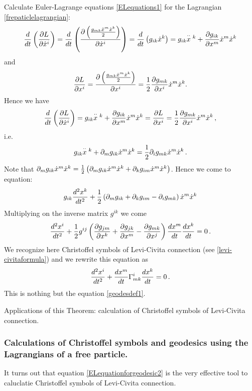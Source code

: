 \documentclass[12pt]{article}
\theoremstyle{theorem}
\numberwithin{equation}{section}
\begin{document}
{Calculate Euler-Lagrange equations \eqref{ELequations1} for the Lagrangian \eqref{frepaticlelagrangian}:
               $$
    {d\over dt}\left({\p L\over \p \dot x^i}\right)=
    {d\over dt}\left({\p \left({g_{mk}\dot x^m\dot x^k\over 2}\right)\over \p \dot x^i}\right)=
     {d\over dt}\left(g_{ik}\dot x^k\right)=
    g_{ik}{\buildrel \cdot\cdot\over x{^k}}+{\p g_{ik}\over \p x^m}\dot x^m\dot x^k
               $$
and
            $$
            {\partial L\over \partial  x^i}={\partial \left({g_{mk}\dot x^m\dot x^k\over 2}\right)\over \partial  x^i}=
            {1\over 2}{\partial g_{mk}\over \partial x^i}\dot x^m\dot x^k.
            $$
Hence we have
           $$
 {d\over dt}\left({\p L\over \p \dot x^i}\right)=
 g_{ik}{\buildrel \cdot\cdot\over x{^k}}+{\p g_{ik}\over \p x^m}\dot x^m\dot x^k=
    {\p L\over \p  x^i}={1\over 2}{\p g_{mk}\over \p x^i}\dot x^m\dot x^k\,,
           $$
  i.e.
       $$
 g_{ik}{\buildrel \cdot\cdot\over x{^k}}+\p_mg_{ik}\dot x^m\dot x^k=
 {1\over 2}\p_i g_{mk}\dot x^m\dot x^k\,.
       $$
 Note that    $\partial_mg_{ik}\dot x^m\dot x^k={1\over 2}\left(\partial_mg_{ik}\dot x^m\dot x^k+\partial_kg_{im}\dot x^m\dot x^k\right)$.
Hence we come to equation:
               $$
               g_{ik}{d^2 x^k\over dt^2}+
               {1\over 2}\left(
 \partial_mg_{ik}+\partial_kg_{im}-\partial_ig_{mk}
                  \right)\dot x^m\dot x^k
               $$
 Multiplying on the inverse matrix $g^{ik}$ we come
\begin{equation}\label{ELequationforgeodesic1}
    {d^2 x^i\over dt^2}+{1\over 2}g^{ij}\left({\partial g_{jm}\over\partial x^k}+
    {\partial g_{jk}\over\partial x^m}-{\partial g_{mk}\over \partial x^j}\right){dx^m\over dt}{dx^k\over dt}=0\,.
\end{equation}
We recognize here Christoffel symbols of Levi-Civita connection (see \eqref{levi-civitaformula}) and we rewrite
this equation as
   \begin{equation}\label{ELequationforgeodesic2}
    {d^2 x^i\over dt^2}+{dx^m\over dt}\Gamma^i_{mk}{dx^k\over dt}=0\,.
\end{equation}
This is nothing but the equation \eqref{geodesdef1}.

Applications of this Theorem: calculation of Christoffel symbols of Levi-Civita connection.



\subsubsection { Calculations of Christoffel 
symbols and geodesics using the Lagrangians of a free particle.}
It turns out that 
  equation \eqref{ELequationforgeodesic2}
is the very effective tool to  caluclatie Christoffel symbols
of Levi-Civita connection.

}
\end{document}
